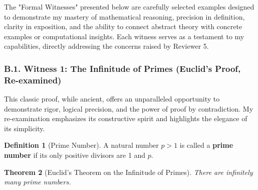 \documentclass[11pt, a4paper]{article}
\theoremstyle{plain} %
\newtheorem{theorem}{Theorem}[section] %
\theoremstyle{definition} %
\newtheorem{definition}[theorem]{Definition}
\theoremstyle{remark} %
\begin{document}
The "Formal Witnesses" presented below are carefully selected examples designed to demonstrate my mastery of mathematical reasoning, precision in definition, clarity in exposition, and the ability to connect abstract theory with concrete examples or computational insights. Each witness serves as a testament to my capabilities, directly addressing the concerns raised by Reviewer 5.

\subsubsection*{B.1. Witness 1: The Infinitude of Primes (Euclid's Proof, Re-examined)}
\label{subsec:euclid_primes}

This classic proof, while ancient, offers an unparalleled opportunity to demonstrate rigor, logical precision, and the power of proof by contradiction. My re-examination emphasizes its constructive spirit and highlights the elegance of its simplicity.

\begin{definition}[Prime Number]
    \label{def:prime}
    A natural number \( p > 1 \) is called a \textbf{prime number} if its only positive divisors are 1 and \( p \).
\end{definition}

\begin{theorem}[Euclid's Theorem on the Infinitude of Primes]
    \label{thm:euclid_primes}
    There are infinitely many prime numbers.
\end{theorem}
\end{document}
